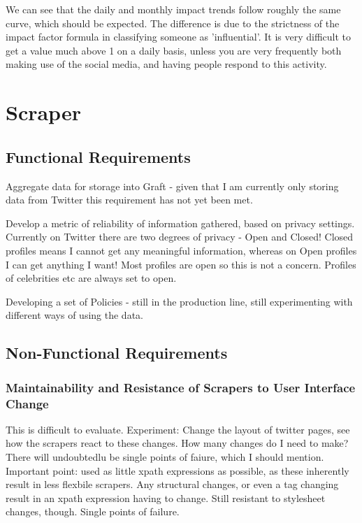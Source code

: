We can see that the daily and monthly impact trends follow roughly the same curve, which should be expected. The difference is due to the strictness of the impact factor formula in classifying someone as 'influential'. It is very difficult to get a value much above 1 on a daily basis, unless you are very frequently both making use of the social media, and having people respond to this activity. 

\section{Scraper}

\subsection{Functional Requirements}

Aggregate data for storage into Graft - given that I am currently only storing data from Twitter this requirement has not yet been met.

Develop a metric of reliability of information gathered, based on privacy settings. Currently on Twitter there are two degrees of privacy - Open and Closed! Closed profiles means I cannot get any meaningful information, whereas on Open profiles I can get anything I want! Most profiles are open so this is not a concern. Profiles of celebrities etc are always set to open.

Developing a set of Policies - still in the production line, still experimenting with different ways of using the data.

\subsection{Non-Functional Requirements}

\subsubsection{Maintainability and Resistance of Scrapers to User Interface Change}
This is difficult to evaluate. Experiment: Change the layout of twitter pages, see how the scrapers react to these changes. How many changes do I need to make? There will undoubtedlu be single points of faiure, which I should mention. Important point: used as little xpath expressions as possible, as these inherently result in less flexbile scrapers. Any structural changes, or even a tag changing result in an xpath expression having to change. Still resistant to stylesheet changes, though.
Single points of failure.

